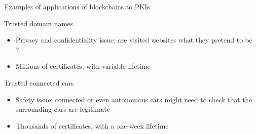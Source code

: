 \begin{frame}{Examples of applications of blockchains to PKIs}

	\begin{exampleblock}{Trusted domain names}
		\begin{itemize}
			\item Privacy and confidentiality issue: are visited websites what they pretend to be ?
			\item Millions of certificates, with variable lifetime
		\end{itemize}
	\end{exampleblock}
	
	\begin{alertblock}{Trusted connected cars}
		\begin{itemize}
			\item Safety issue: connected or even autonomous cars might need to check that the surrounding cars are legitimate
			\item Thousands of certificates, with a one-week lifetime
		\end{itemize}
	\end{alertblock}


\end{frame}